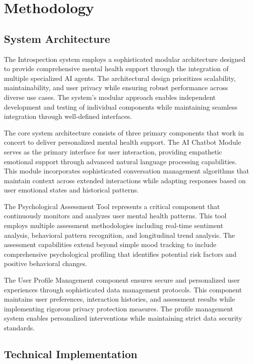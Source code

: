 \section{Methodology}
\label{sec:methodology}

\subsection{System Architecture}

The Introspection system employs a sophisticated modular architecture designed to provide comprehensive mental health support through the integration of multiple specialized AI agents. The architectural design prioritizes scalability, maintainability, and user privacy while ensuring robust performance across diverse use cases. The system's modular approach enables independent development and testing of individual components while maintaining seamless integration through well-defined interfaces.

The core system architecture consists of three primary components that work in concert to deliver personalized mental health support. The AI Chatbot Module serves as the primary interface for user interaction, providing empathetic emotional support through advanced natural language processing capabilities. This module incorporates sophisticated conversation management algorithms that maintain context across extended interactions while adapting responses based on user emotional states and historical patterns.

The Psychological Assessment Tool represents a critical component that continuously monitors and analyzes user mental health patterns. This tool employs multiple assessment methodologies including real-time sentiment analysis, behavioral pattern recognition, and longitudinal trend analysis. The assessment capabilities extend beyond simple mood tracking to include comprehensive psychological profiling that identifies potential risk factors and positive behavioral changes.

The User Profile Management component ensures secure and personalized user experiences through sophisticated data management protocols. This component maintains user preferences, interaction histories, and assessment results while implementing rigorous privacy protection measures. The profile management system enables personalized interventions while maintaining strict data security standards.

\subsection{Technical Implementation}


